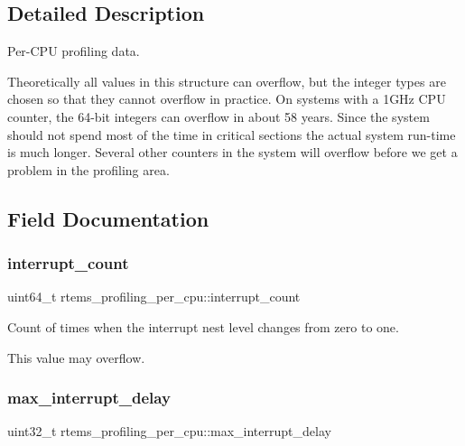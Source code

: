 \subsection{Detailed Description}
Per-\/\+C\+PU profiling data. 

Theoretically all values in this structure can overflow, but the integer types are chosen so that they cannot overflow in practice. On systems with a 1G\+Hz C\+PU counter, the 64-\/bit integers can overflow in about 58 years. Since the system should not spend most of the time in critical sections the actual system run-\/time is much longer. Several other counters in the system will overflow before we get a problem in the profiling area. 

\subsection{Field Documentation}
\mbox{\label{structrtems__profiling__per__cpu_afd48c947ae70c7739575621fb156f1e4}} 
\subsubsection{\texorpdfstring{interrupt\_count}{interrupt\_count}}
{\footnotesize\ttfamily uint64\+\_\+t rtems\+\_\+profiling\+\_\+per\+\_\+cpu\+::interrupt\+\_\+count}



Count of times when the interrupt nest level changes from zero to one. 

This value may overflow. \mbox{\label{structrtems__profiling__per__cpu_a8d43d26a8e780a2fa616c402396b351c}} 
\subsubsection{\texorpdfstring{max\_interrupt\_delay}{max\_interrupt\_delay}}
{\footnotesize\ttfamily uint32\+\_\+t rtems\+\_\+profiling\+\_\+per\+\_\+cpu\+::max\+\_\+interrupt\+\_\+delay}



